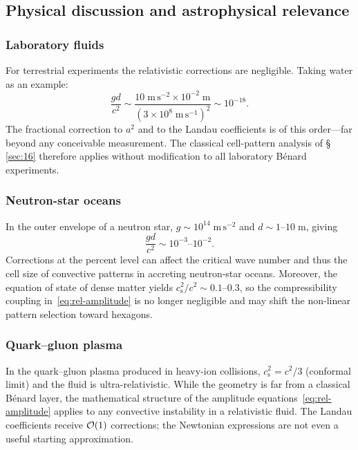\subsection{Physical discussion and astrophysical
  relevance}\label{sec:rel-16-discussion}

\subsubsection*{Laboratory fluids}

For terrestrial experiments the relativistic corrections are
negligible.  Taking water as an example:
\begin{equation}
\label{eq:rel-lab-estimate}
\frac{gd}{c^{2}}
  \sim \frac{10\;\mathrm{m\,s^{-2}}\times 10^{-2}\;\mathrm{m}}
       {(3\times 10^{8}\;\mathrm{m\,s^{-1}})^{2}}
  \sim 10^{-18}.
\end{equation}
The fractional correction to $a^{2}$ and to the Landau coefficients
is of this order---far beyond any conceivable measurement.  The
classical cell-pattern analysis of \S\,\ref{sec:16} therefore
applies without modification to all laboratory B\'enard experiments.

\subsubsection*{Neutron-star oceans}

In the outer envelope of a neutron star, $g\sim 10^{14}\;\mathrm{m\,s^{-2}}$
and $d\sim 1$--$10\;\mathrm{m}$, giving
\begin{equation}
\label{eq:rel-ns-estimate}
\frac{gd}{c^{2}} \sim 10^{-3}\text{--}10^{-2}.
\end{equation}
Corrections at the percent level can affect the critical wave number
and thus the cell size of convective patterns in accreting neutron-star
oceans.  Moreover, the equation of state of dense matter yields
$c_{\mathrm{s}}^{2}/c^{2}\sim 0.1$--$0.3$, so the compressibility
coupling in~\eqref{eq:rel-amplitude} is no longer negligible and may
shift the non-linear pattern selection toward hexagons.

\subsubsection*{Quark--gluon plasma}

In the quark--gluon plasma produced in heavy-ion collisions,
$c_{\mathrm{s}}^{2}=c^{2}/3$ (conformal limit) and the fluid is
ultra-relativistic.  While the geometry is far from a classical
B\'enard layer, the mathematical structure of the amplitude
equations~\eqref{eq:rel-amplitude} applies to any convective
instability in a relativistic fluid.  The Landau coefficients
receive $\mathcal{O}(1)$ corrections; the Newtonian expressions are
not even a useful starting approximation.

